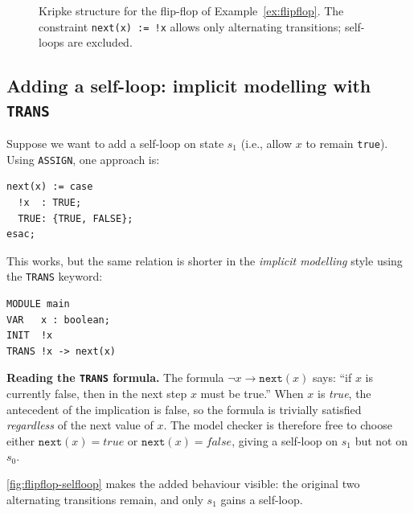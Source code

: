 \begin{figure}[ht]
  \centering
  \caption{Kripke structure for the flip-flop of Example~\ref{ex:flipflop}.
           The constraint \texttt{next(x) := !x} allows only alternating
           transitions; self-loops are excluded.}
  \label{fig:flipflop}
\end{figure}

\subsection{Adding a self-loop: implicit modelling with \texttt{TRANS}}
\label{sec:smv-trans}

Suppose we want to add a self-loop on state $s_1$ (i.e., allow $x$ to
remain \texttt{true}).  Using \texttt{ASSIGN}, one approach is:
\begin{verbatim}
next(x) := case
  !x  : TRUE;
  TRUE: {TRUE, FALSE};
esac;
\end{verbatim}
This works, but the same relation is shorter in the \emph{implicit
modelling} style using the \texttt{TRANS} keyword:

\begin{verbatim}
MODULE main
VAR   x : boolean;
INIT  !x
TRANS !x -> next(x)
\end{verbatim}

\textbf{Reading the \texttt{TRANS} formula.}  The formula
$\neg x \to \texttt{next}(x)$ says: ``if $x$ is currently false, then in
the next step $x$ must be true.''  When $x$ is \emph{true}, the antecedent
of the implication is false, so the formula is trivially satisfied
\emph{regardless} of the next value of $x$.  The model checker is therefore
free to choose either $\texttt{next}(x) = \mathit{true}$ or
$\texttt{next}(x) = \mathit{false}$, giving a self-loop on $s_1$ but not
on $s_0$.

\cref{fig:flipflop-selfloop} makes the added behaviour visible: the original
two alternating transitions remain, and only $s_1$ gains a self-loop.

